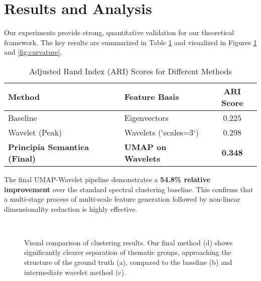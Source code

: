 \documentclass[11pt, letterpaper]{article}
\begin{document}
\section{Results and Analysis}
Our experiments provide strong, quantitative validation for our theoretical framework. The key results are summarized in Table \ref{tab:results} and visualized in Figures \ref{fig:cluster_comparison} and \ref{fig:curvature}.

\begin{table}[h!]
\centering
\caption{Adjusted Rand Index (ARI) Scores for Different Methods}
\label{tab:results}
\begin{tabular}{@{}llc@{}}
\toprule
\textbf{Method}                  & \textbf{Feature Basis}             & \textbf{ARI Score} \\ \midrule
Baseline                         & Eigenvectors                       & 0.225              \\
Wavelet (Peak)                   & Wavelets (`scales=3`)              & 0.298              \\
\textbf{Principia Semantica (Final)} & \textbf{UMAP on Wavelets} & \textbf{0.348}     \\ \bottomrule
\end{tabular}
\end{table}

The final UMAP-Wavelet pipeline demonstrates a \textbf{54.8\% relative improvement} over the standard spectral clustering baseline. This confirms that a multi-stage process of multi-scale feature generation followed by non-linear dimensionality reduction is highly effective.

\begin{figure}[h!]
    \centering
    \hfill
    \\
    \hfill
    \caption{Visual comparison of clustering results. Our final method (d) shows significantly clearer separation of thematic groups, approaching the structure of the ground truth (a), compared to the baseline (b) and intermediate wavelet method (c).}
    \label{fig:cluster_comparison}
\end{figure}
\end{document}
